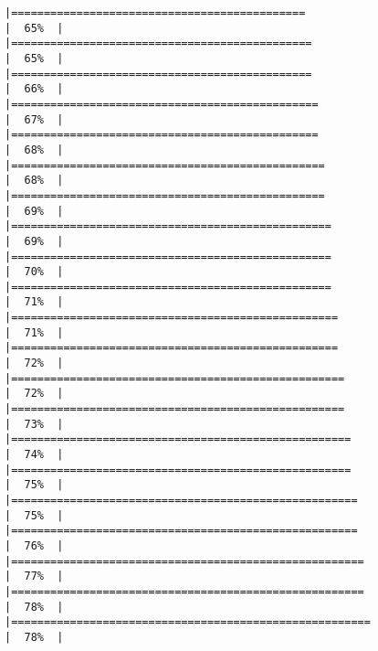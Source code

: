 \documentclass[
]{article}
\begin{document}
\begin{verbatim}
|=============================================                         |  65%  |                                                                              |==============================================                        |  65%  |                                                                              |==============================================                        |  66%  |                                                                              |===============================================                       |  67%  |                                                                              |===============================================                       |  68%  |                                                                              |================================================                      |  68%  |                                                                              |================================================                      |  69%  |                                                                              |=================================================                     |  69%  |                                                                              |=================================================                     |  70%  |                                                                              |=================================================                     |  71%  |                                                                              |==================================================                    |  71%  |                                                                              |==================================================                    |  72%  |                                                                              |===================================================                   |  72%  |                                                                              |===================================================                   |  73%  |                                                                              |====================================================                  |  74%  |                                                                              |====================================================                  |  75%  |                                                                              |=====================================================                 |  75%  |                                                                              |=====================================================                 |  76%  |                                                                              |======================================================                |  77%  |                                                                              |======================================================                |  78%  |                                                                              |=======================================================               |  78%  |                                                                              
\end{verbatim}
\end{document}
